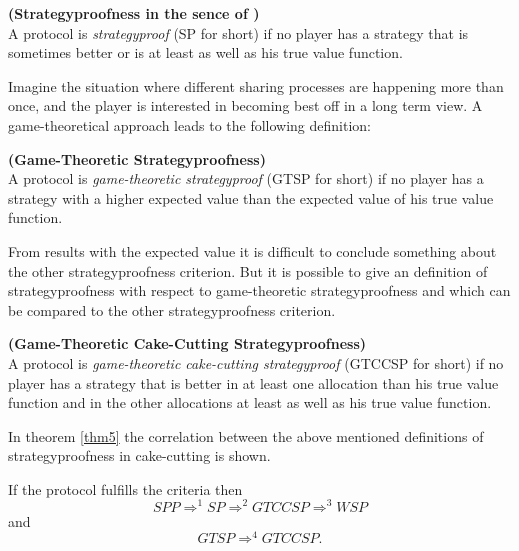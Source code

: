 \begin{defi}{\textbf{(Strategyproofness in the sence of \cite{note})}}\\
A protocol is \emph{strategyproof} (SP for short) if no player has a strategy that is sometimes better or is at least as well as his true value function.\end{defi}
Imagine the situation where different sharing processes are happening more than once, and the player is interested in becoming best off in a long term view. A game-theoretical approach leads to the following definition:
\begin{defi}{\textbf{(Game-Theoretic Strategyproofness)}}\\
A protocol is \emph{game-theoretic strategyproof} (GTSP for short) if no player has a strategy with a higher expected value than the expected value of his true value function.\end{defi}
From results with the expected value it is difficult to conclude something about the other strategyproofness criterion. But it is possible to give an definition of strategyproofness with respect to game-theoretic strategyproofness and which can be compared to the other strategyproofness criterion.
\begin{defi}{\textbf{(Game-Theoretic Cake-Cutting Strategyproofness)}}\\
A protocol is \emph{game-theoretic cake-cutting strategyproof} (GTCCSP for short) if no player has a strategy that is better in at least one allocation than his true value function and in the other allocations at least as well as his true value function.\end{defi}
In theorem \ref{thm5} the correlation between the above mentioned definitions of strategyproofness in cake-cutting is shown.
\begin{lem}
\label{thm5} If the protocol fulfills the criteria then $$SPP \Rightarrow^{1} SP \Rightarrow^{2} GTCCSP \Rightarrow^{3} WSP$$ and
$$GTSP \Rightarrow^{4} GTCCSP.$$
\end{lem}
